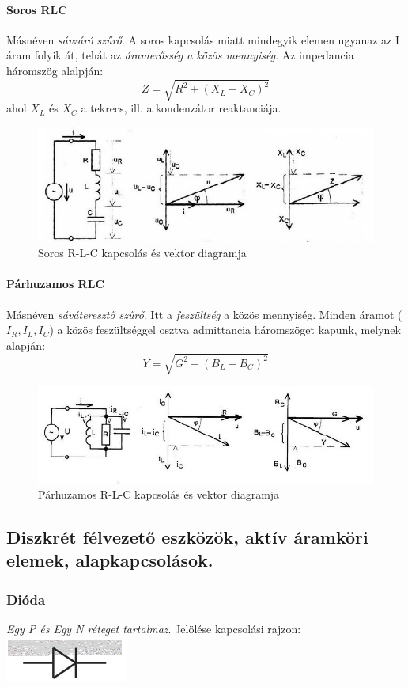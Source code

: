 \paragraph{Soros RLC} Másnéven \emph{sávzáró szűrő}. A soros kapcsolás miatt mindegyik elemen ugyanaz az I áram folyik át, tehát az \emph{áramerősség a közös mennyiség}. Az impedancia háromszög alalpján:
$$ Z = \sqrt{R^2 + (X_L - X_C)^2}$$
ahol $X_L$ és $X_C$ a tekrecs, ill. a kondenzátor reaktanciája.
\begin{figure}[h]
	\centering
	\includegraphics[width=0.5\linewidth]{fig/10-serialRLC}
	\caption{Soros R-L-C kapcsolás és vektor diagramja}
	\label{fig:10-serialrlc}
\end{figure}

\paragraph{Párhuzamos RLC} Másnéven \emph{sáváteresztő szűrő}. Itt a \emph{feszültség} a közös mennyiség. Minden áramot ($I_R, I_L, I_C$) a közös feszültséggel osztva admittancia háromszöget kapunk, melynek alapján:
$$ Y = \sqrt{G^2 + (B_L - B_C)^2}$$
\begin{figure}[h]
	\centering
	\includegraphics[width=0.5\linewidth]{fig/10-parallelRLC}
	\caption{Párhuzamos R-L-C kapcsolás és vektor diagramja}
	\label{fig:10-parallelrlc}
\end{figure}


\subsection{Diszkrét félvezető eszközök, aktív áramköri elemek, alapkapcsolások.}
\subsubsection{Dióda}
\emph{Egy P és Egy N réteget tartalmaz}. Jelölése kapcsolási rajzon: \includegraphics[width=0.2\linewidth]{fig/10-diode}

